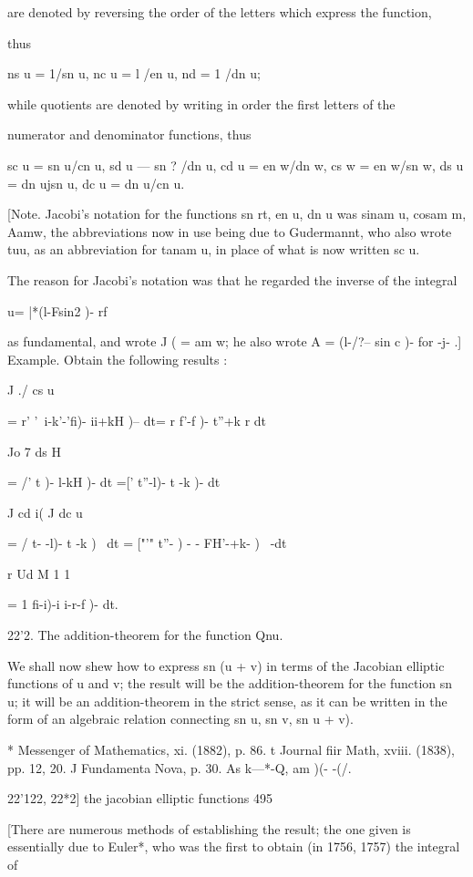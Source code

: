are denoted by reversing the order of the letters which express the
function,

thus

ns u = 1/sn u, nc u = l /en u, nd = 1 /dn u;

while quotients are denoted by writing in order the first letters of
the

numerator and denominator functions, thus

sc u = sn u/cn u, sd u — sn ? /dn u, cd u = en w/dn w, cs w = en w/sn
w, ds u = dn ujsn u, dc u = dn u/cn u.

[Note. Jacobi's notation for the functions sn rt, en u, dn u was sinam
u, cosam m, Aamw, the abbreviations now in use being due to
Gudermannt, who also wrote tuu, as an abbreviation for tanam u, in
place of what is now written sc u.

The reason for Jacobi's notation was that he regarded the inverse of
the integral

u= |*(l-Fsin2 )- rf

as fundamental, and wrote J ( = am w; he also wrote A = (l-/?-- sin c
)- for -j- .] Example. Obtain the following results :

J ./ cs u

= r' '\ i-k'-'fi)- ii+kH )-- dt= r f'-f )- t''+k r dt

Jo 7 ds H

= /' t )- l-kH )- dt =[' t''-l)- t -k )- dt

J cd i( J dc u

= / t- -l)- t -k )~ dt = ["'" t''- ) - - FH'-+k- )~ -dt

r Ud M 1 1

= 1 fi-i)-i i-r-f )- dt.

22'2. The addition-theorem for the function Qnu.

We shall now shew how to express sn (u + v) in terms of the Jacobian
elliptic functions of u and v; the result will be the
addition-theorem for the function sn u; it will be an
addition-theorem in the strict sense, as it can be written in the form
of an algebraic relation connecting sn u, sn v, sn u + v).

* Messenger of Mathematics, xi. (1882), p. 86. t Journal fiir Math,
xviii. (1838), pp. 12, 20. J Fundamenta Nova, p. 30. As k—*-Q, am )(-
-(/.

22'122, 22*2] the jacobian elliptic functions 495

[There are numerous methods of establishing the result; the one given
is essentially due to Euler*, who was the first to obtain (in 1756,
1757) the integral of

